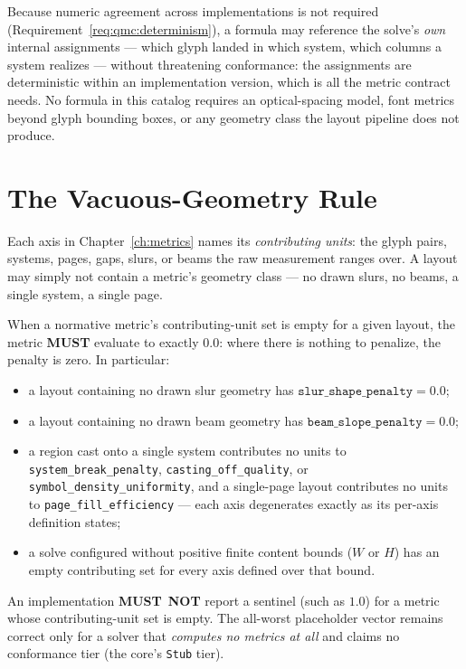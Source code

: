 \documentclass[11pt,letterpaper]{report}
\newcounter{requirement}[chapter]
\newcommand{\MUST}{\textbf{MUST}}
\newcommand{\MUSTNOT}{\textbf{MUST}\nobreak\ \textbf{NOT}}
\begin{document}
Because numeric agreement across implementations is not required
(Requirement~\ref{req:qmc:determinism}), a formula may reference the
solve's \emph{own} internal assignments --- which glyph landed in which
system, which columns a system realizes --- without threatening
conformance: the assignments are deterministic within an implementation
version, which is all the metric contract needs. No formula in this
catalog requires an optical-spacing model, font metrics beyond glyph
bounding boxes, or any geometry class the layout pipeline does not
produce.

\section{The Vacuous-Geometry Rule}
\label{sec:model:vacuous}

Each axis in Chapter~\ref{ch:metrics} names its \emph{contributing units}:
the glyph pairs, systems, pages, gaps, slurs, or beams the raw measurement
ranges over. A layout may simply not contain a metric's geometry class ---
no drawn slurs, no beams, a single system, a single page.

\begin{requirement}
\label{req:qmc:vacuous}
When a normative metric's contributing-unit set is empty for a given
layout, the metric \MUST{} evaluate to exactly $0.0$: where there is
nothing to penalize, the penalty is zero. In particular:

\begin{itemize}
  \item a layout containing no drawn slur geometry has
    $\texttt{slur\_shape\_penalty} = 0.0$;
  \item a layout containing no drawn beam geometry has
    $\texttt{beam\_slope\_penalty} = 0.0$;
  \item a region cast onto a single system contributes no units to
    \texttt{system\_break\_penalty}, \texttt{casting\_off\_quality}, or
    \texttt{symbol\_density\_uniformity}, and a single-page layout
    contributes no units to \texttt{page\_fill\_efficiency} --- each axis
    degenerates exactly as its per-axis definition states;
  \item a solve configured without positive finite content bounds ($W$ or
    $H$) has an empty contributing set for every axis defined over that
    bound.
\end{itemize}

An implementation \MUSTNOT{} report a sentinel (such as $1.0$) for a
metric whose contributing-unit set is empty. The all-worst placeholder
vector remains correct only for a solver that \emph{computes no metrics at
all} and claims no conformance tier (the core's \texttt{Stub} tier).
\end{requirement}
\end{document}
